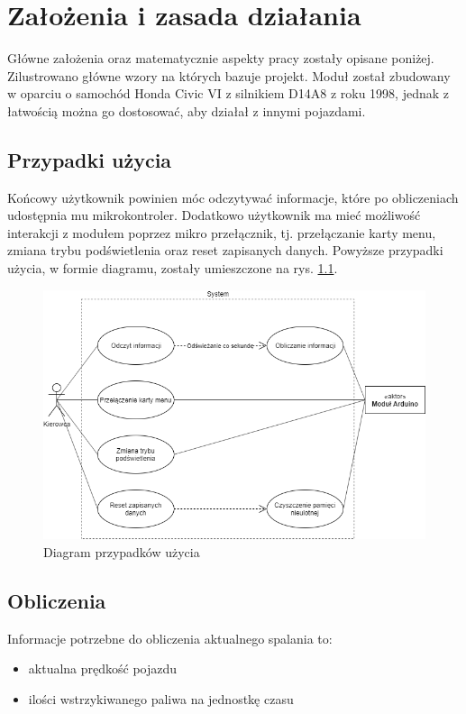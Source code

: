 \chapter{Założenia i zasada działania}
Główne założenia oraz matematycznie aspekty pracy zostały opisane poniżej. Zilustrowano główne wzory na których bazuje projekt.
Moduł został zbudowany w oparciu o samochód Honda Civic VI z silnikiem D14A8 z roku 1998, jednak z łatwością można go dostosować, aby działał z innymi pojazdami.

\section{Przypadki użycia}
Końcowy użytkownik powinien móc odczytywać informacje, które po obliczeniach udostępnia mu mikrokontroler. Dodatkowo użytkownik ma mieć możliwość interakcji z modułem poprzez mikro przełącznik, tj. przełączanie karty menu, zmiana trybu podświetlenia oraz reset zapisanych danych. Powyższe przypadki użycia, w formie diagramu, zostały umieszczone na rys. \ref{fig:diagram}.

\begin{figure}[!htb]
\centering
\includegraphics[width=1\linewidth]{Rysunki/diagram.png}
\caption{Diagram przypadków użycia}
\label{fig:diagram}
\end{figure}

\section{Obliczenia}
\par Informacje potrzebne do obliczenia aktualnego spalania to:
\begin{itemize}
\item{aktualna prędkość pojazdu}
\item{ilości wstrzykiwanego paliwa na jednostkę czasu}
\end{itemize}

